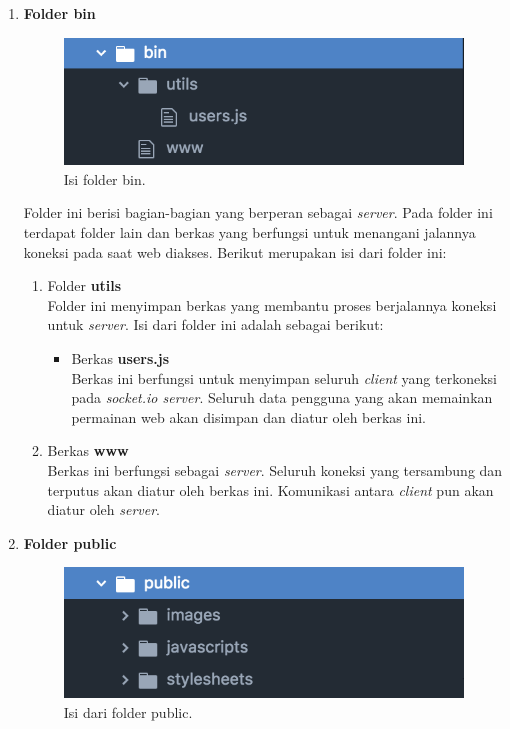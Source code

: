 \begin{enumerate}
	\item \textbf{Folder bin} \\
	
	\begin{figure}[H]
		\centering
		\includegraphics[scale=0.4]{Gambar/direktori_bin}
		\caption{Isi folder bin.}
		\label{fig:direktori_bin}
	\end{figure}
	
	Folder ini berisi bagian-bagian yang berperan sebagai \textit{server}. Pada folder ini terdapat folder lain dan berkas yang berfungsi untuk menangani jalannya koneksi pada saat web diakses. Berikut merupakan isi dari folder ini:
	\begin{enumerate}
		\item Folder \textbf{utils} \\
		Folder ini menyimpan berkas yang membantu proses berjalannya koneksi untuk \textit{server}. Isi dari folder ini adalah sebagai berikut:
		\begin{itemize}
			\item Berkas \textbf{users.js}  \\
			Berkas ini berfungsi untuk menyimpan seluruh \textit{client} yang terkoneksi pada \textit{socket.io server}. Seluruh data pengguna yang akan memainkan permainan web akan disimpan dan diatur oleh berkas ini.
		\end{itemize}
	
		\item Berkas \textbf{www} \\
		Berkas ini berfungsi sebagai \textit{server}. Seluruh koneksi yang tersambung dan terputus akan diatur oleh berkas ini. Komunikasi antara \textit{client} pun akan diatur oleh \textit{server}.
	\end{enumerate}
	
	\item \textbf{Folder public} \\
	
	\begin{figure}[H]
		\centering
		\includegraphics[scale=0.4]{Gambar/direktori_public}
		\caption{Isi dari folder public.}
		\label{fig:direktori_public}
	\end{figure}
	

\end{enumerate}
